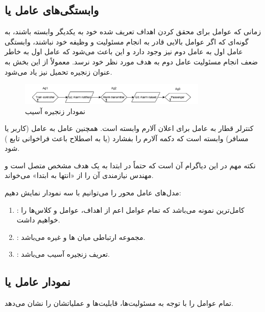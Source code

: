 \subsection{وابستگی‌های عامل یا }

زمانی که عوامل برای محقق کردن اهداف تعریف شده خود به یکدیگر وابسته باشند، به
گونه‌ای که اگر عوامل بالایی قادر به انجام مسئولیت و وظیفه خود نباشند، وابستگی
عامل اول به عامل دوم نیز وجود دارد و این باعث می‌شود که عامل اول به خاطر ضعف
انجام مسئولیت عامل دوم به هدف مورد نظر خود نرسد. معمولاً از این بخش به عنوان
زنجیره تحمیل نیز یاد می‌شود.

\begin{figure}[H]
    \centering
    \includegraphics[width=0.8\textwidth]{assets/agent_dependencies.drawio.pdf}
    \caption{نمودار زنجیره آسیب}
\end{figure}

کنترلر قطار به عامل  برای اعلان آلارم وابسته است. همچنین
عامل  به عامل (کاربر یا مسافر) وابسته است که دکمه آلارم را
بفشارد (یا به اصطلاح باعث فراخوانی تابع ) شود.

نکته مهم در این دیاگرام آن است که حتماً در ابتدا به یک هدف مشخص متصل است و مهندس
نیازمندی آن را از «انتها به ابتدا» می‌خواند.

مدل‌های عامل محور را می‌توانیم با سه نمودار نمایش دهیم:

\begin{enumerate}
    \item {}: کامل‌ترین نمونه می‌باشد که تمام عوامل اعم از
    اهداف، عوامل و کلاس‌ها را خواهیم داشت.
    \item {}: مجموعه ارتباطی میان ها و غیره
    می‌باشد.
    \item {}: تعریف زنجیره آسیب می‌باشد.
\end{enumerate}

\subsection{نمودار عامل یا }

تمام عوامل را با توجه به مسئولیت‌ها، قابلیت‌ها و عملیاتشان را نشان می‌دهد.

